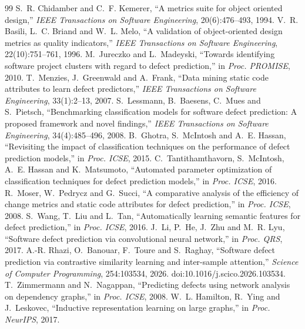 \documentclass[11pt,a4paper,openany]{report}
\begin{document}
\begin{thebibliography}{99}
\small
{} S.~R. Chidamber and C.~F. Kemerer, ``A metrics suite for object oriented design,''
  \emph{IEEE Transactions on Software Engineering}, 20(6):476--493, 1994.
 V.~R. Basili, L.~C. Briand and W.~L. Melo, ``A validation of object-oriented design metrics as
  quality indicators,'' \emph{IEEE Transactions on Software Engineering}, 22(10):751--761, 1996.
 M.~Jureczko and L.~Madeyski, ``Towards identifying software project clusters with regard to
  defect prediction,'' in \emph{Proc. PROMISE}, 2010.
 T.~Menzies, J.~Greenwald and A.~Frank, ``Data mining static code attributes to learn defect
  predictors,'' \emph{IEEE Transactions on Software Engineering}, 33(1):2--13, 2007.
 S.~Lessmann, B.~Baesens, C.~Mues and S.~Pietsch, ``Benchmarking classification models for
  software defect prediction: A proposed framework and novel findings,'' \emph{IEEE Transactions on Software
  Engineering}, 34(4):485--496, 2008.
 B.~Ghotra, S.~McIntosh and A.~E. Hassan, ``Revisiting the impact of classification techniques
  on the performance of defect prediction models,'' in \emph{Proc. ICSE}, 2015.
 C.~Tantithamthavorn, S.~McIntosh, A.~E. Hassan and K.~Matsumoto, ``Automated parameter
  optimization of classification techniques for defect prediction models,'' in \emph{Proc. ICSE}, 2016.
 R.~Moser, W.~Pedrycz and G.~Succi, ``A comparative analysis of the efficiency of change metrics
  and static code attributes for defect prediction,'' in \emph{Proc. ICSE}, 2008.
 S.~Wang, T.~Liu and L.~Tan, ``Automatically learning semantic features for defect prediction,''
  in \emph{Proc. ICSE}, 2016.
 J.~Li, P.~He, J.~Zhu and M.~R. Lyu, ``Software defect prediction via convolutional neural network,''
  in \emph{Proc. QRS}, 2017.
 A.-R. Rhazi, O.~Banouar, F.~Toure and S.~Raghay, ``Software defect prediction via contrastive
  similarity learning and inter-sample attention,'' \emph{Science of Computer Programming}, 254:103534, 2026.
  doi:10.1016/j.scico.2026.103534.
 T.~Zimmermann and N.~Nagappan, ``Predicting defects using network analysis on dependency
  graphs,'' in \emph{Proc. ICSE}, 2008.
 W.~L. Hamilton, R.~Ying and J.~Leskovec, ``Inductive representation learning on large
  graphs,'' in \emph{Proc. NeurIPS}, 2017.

\end{thebibliography}
\end{document}
